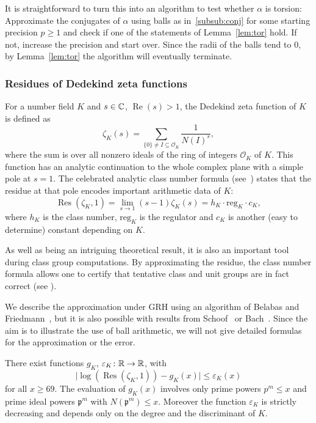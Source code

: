 \documentclass{sig-alternate-05-2015}
\begin{document}
It is straightforward to turn this into an algorithm to test whether $\alpha$ is torsion: Approximate the conjugates of $\alpha$ using balls
as in~\ref{subsub:conj} for some starting precision $p \geq 1$ and check if one of the statements of Lemma~\ref{lem:tor} hold.
If not, increase the precision and start over.
Since the radii of the balls tend to $0$, by Lemma~\ref{lem:tor} the algorithm will eventually terminate.

\subsubsection{Residues of Dedekind zeta functions}

For a number field $K$ and $s \in \mathbb{C}$, $\operatorname{Re}(s) > 1$, the Dedekind zeta function of $K$ is defined as
\[ \zeta_K(s) = \sum_{\{0\} \neq I \subseteq \mathcal O_K} \frac 1 {N(I)^s}, \]
where the sum is over all nonzero ideals of the ring of integers $\mathcal O_K$ of $K$.
This function has an analytic continuation to the whole complex plane with a simple pole at $s = 1$. The celebrated analytic class number formula
(see~\cite{Cohen1993}) states that the residue at that pole encodes important arithmetic data of $K$:
\[ \operatorname{Res}(\zeta_K, 1) =\lim_{s \to 1}(s - 1)\zeta_K(s) = h_K \cdot \mathrm{reg}_K \cdot c_K, \]
where $h_K$ is the class number, $\mathrm{reg}_K$ is the regulator and $c_K$ is another (easy to determine) constant depending on $K$.

As well as being an intriguing theoretical result, it is also an important tool during class group computations.
By approximating the residue, the class number formula allows one to certify that tentative class and unit groups are in fact
correct (see \cite{Biasse2014}).

We describe the approximation under GRH using an algorithm of Belabas and Friedmann~\cite{Belabas2015}, but it is also possible with
results from Schoof~\cite{Schoof1982} or Bach~\cite{Bach1995}.
Since the aim is to illustrate the use of ball arithmetic, we will not give detailed formulas for the approximation or the error.

\begin{theorem}
There exist functions $g_K$, $\varepsilon_K \colon \mathbb{R} \to \mathbb{R}$, with
\[ \lvert \log(\operatorname{Res}(\zeta_K, 1)) - g_K(x) \rvert \leq \varepsilon_K(x) \]
for all $x \geq 69$. The evaluation of $g_K(x)$ involves only prime powers $p^m \leq x$ and prime ideal powers $\mathfrak p^m$ with
$N(\mathfrak p^m) \leq x$. Moreover the function $\varepsilon_K$ is strictly decreasing and depends only on the degree and the
discriminant of $K$.
\end{theorem}
\end{document}
